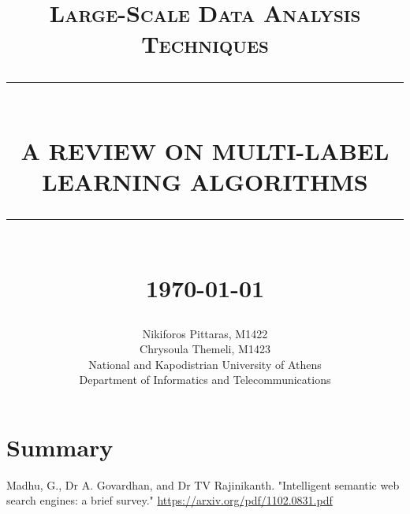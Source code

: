 \documentclass[12pt]{report}
\newcommand{\HRule}[1]{\rule{\linewidth}{#1}}
\begin{document}
	
	\title{ \normalsize \textsc{Large-Scale Data Analysis Techniques}
		\\ [2.0cm]
		\HRule{0.5pt} \\
		\LARGE \textbf{\uppercase{A Review on Multi-Label Learning Algorithms}}
		\HRule{2pt} \\ [0.5cm]
		\normalsize \today \vspace*{5\baselineskip}}
	
	\date{}
	\author{
		Nikiforos Pittaras, M1422\\
		Chrysoula Themeli, M1423 \\ 
		National and Kapodistrian University of Athens\\
		Department of Informatics and Telecommunications }
	
	\maketitle
	\tableofcontents
	\listoffigures
	\newpage
	
	\sectionfont{\scshape}
	
	
	\section*{Summary}
	
	
	

	\newpage
	\begin{thebibliography}{10}
		Madhu, G., Dr A. Govardhan, and Dr TV Rajinikanth. "Intelligent semantic web search engines: a brief survey." \url{https://arxiv.org/pdf/1102.0831.pdf}
	\end{thebibliography}
\end{document}
